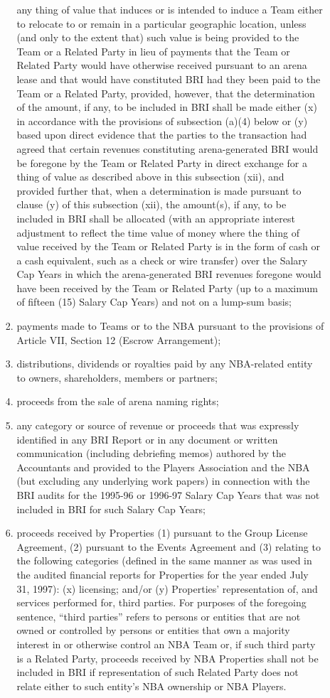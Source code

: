 \documentclass[
]{book}
\begin{document}
\begin{enumerate}
\begin{enumerate}
\begin{enumerate}
      any thing of value that induces or is intended to induce a Team either to relocate to or remain in a particular geographic location, unless (and only to the extent that) such value is being provided to the Team or a Related Party in lieu of payments that the Team or Related Party would have otherwise received pursuant to an arena lease and that would have constituted BRI had they been paid to the Team or a Related Party, provided, however, that the determination of the amount, if any, to be included in BRI shall be made either (x) in accordance with the provisions of subsection (a)(4) below or (y) based upon direct evidence that the parties to the transaction had agreed that certain revenues constituting arena-generated BRI would be foregone by the Team or Related Party in direct exchange for a thing of value as described above in this subsection (xii), and provided further that, when a determination is made pursuant to clause (y) of this subsection (xii), the amount(s), if any, to be included in BRI shall be allocated (with an appropriate interest adjustment to reflect the time value of money where the thing of value received by the Team or Related Party is in the form of cash or a cash equivalent, such as a check or wire transfer) over the Salary Cap Years in which the arena-generated BRI revenues foregone would have been received by the Team or Related Party (up to a maximum of fifteen (15) Salary Cap Years) and not on a lump-sum basis;
    \item
      payments made to Teams or to the NBA pursuant to the provisions of Article VII, Section 12 (Escrow Arrangement);
    \item
      distributions, dividends or royalties paid by any NBA-related entity to owners, shareholders, members or partners;
    \item
      proceeds from the sale of arena naming rights;
    \item
      any category or source of revenue or proceeds that was expressly identified in any BRI Report or in any document or written communication (including debriefing memos) authored by the Accountants and provided to the Players Association and the NBA (but excluding any underlying work papers) in connection with the BRI audits for the 1995-96 or 1996-97 Salary Cap Years that was not included in BRI for such Salary Cap Years;
    \item
      proceeds received by Properties (1) pursuant to the Group License Agreement, (2) pursuant to the Events Agreement and (3) relating to the following categories (defined in the same manner as was used in the audited financial reports for Properties for the year ended July 31, 1997): (x) licensing; and/or (y) Properties' representation of, and services performed for, third parties. For purposes of the foregoing sentence, ``third parties'' refers to persons or entities that are not owned or controlled by persons or entities that own a majority interest in or otherwise control an NBA Team or, if such third party is a Related Party, proceeds received by NBA Properties shall not be included in BRI if representation of such Related Party does not relate either to such entity's NBA ownership or NBA Players.

\end{enumerate}
\end{enumerate}
\end{enumerate}
\end{document}
